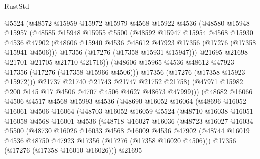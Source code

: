 \begin{lexlean}{RustStd}
\begin{coremodule}
                @5524
                (@48572
                  @15959
                  @15972
                  @15979
                  @4568
                  @15922
                  @4536
                  (@48580
                    @15948
                    @15957
                    (@48585
                      @15948
                      @15955
                      @5500
                      (@48592
                        @15947
                        @15954
                        @4568
                        @15930
                        @4536
                        @47902
                        (@48606 @15940 @4536 @48612 @47923 @17356 (@17276 (@17358 @15941 @4506)))
                        @17356
                        (@17276 (@17358 @15931 @15947)))
                      @21695
                      @21698
                      @21701
                      @21705
                      @21710
                      @21716))
                  (@48606 @15965 @4536 @48612 @47923 @17356 (@17276 (@17358 @15966 @4506)))
                  @17356
                  (@17276 (@17358 @15923 @15972)))
                @21737
                @21740
                @21743
                @21747
                @21752
                @21758)
              (@47971 @15982 @200 @145 @17 @4506 @4707 @4506 @4627 @48673 @47999)))
          (@48682
            @16066
            @4506
            @4517
            @4568
            @15993
            @4536
            (@48690
              @16052
              @16064
              (@48696
                @16052
                @16061
                @4506
                @16064
                (@48703
                  @16052
                  @16059
                  @5524
                  (@48710
                    @16038
                    @16051
                    @16058
                    @4568
                    @16001
                    @4536
                    (@48718
                      @16027
                      @16036
                      (@48723
                        @16027
                        @16034
                        @5500
                        (@48730
                          @16026
                          @16033
                          @4568
                          @16009
                          @4536
                          @47902
                          (@48744 @16019 @4536 @48750 @47923 @17356 (@17276 (@17358 @16020 @4506)))
                          @17356
                          (@17276 (@17358 @16010 @16026)))
                        @21695

\end{coremodule}
\end{lexlean}
